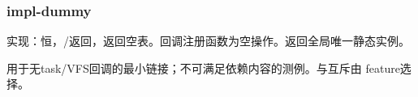 
\subsubsection{impl-dummy}

实现：恒，/返回，返回空表。回调注册函数为空操作。返回全局唯一静态实例。

用于无task/VFS回调的最小链接；不可满足依赖内容的测例。与互斥由 feature选择。
